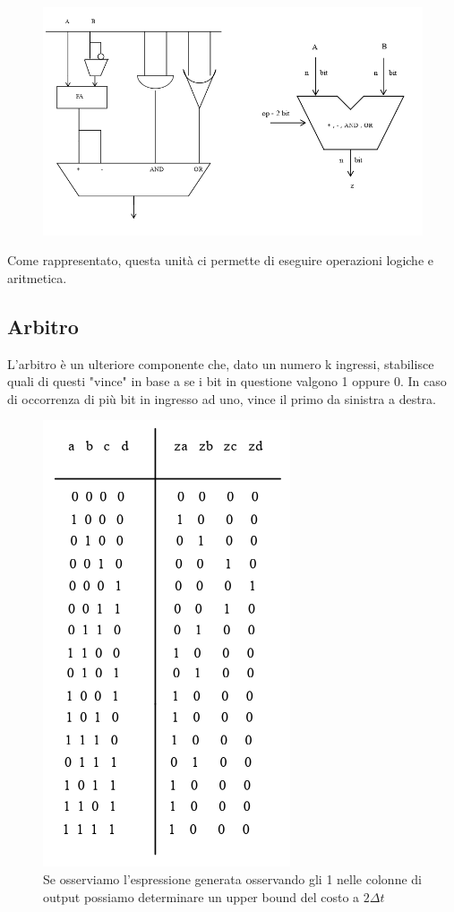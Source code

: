 \documentclass{article}
\begin{document}
\begin{figure}[htbp]
    \center
    \includegraphics[scale=0.45]{img/ALU1.png}
\end{figure}

Come rappresentato, questa unità ci permette di eseguire operazioni logiche e aritmetica.

\subsection{Arbitro}
L'arbitro è un ulteriore componente che, dato un numero k ingressi, stabilisce quali di questi "vince" in base a se i bit in questione 
    valgono 1 oppure 0. In caso di occorrenza di più bit in ingresso ad uno, vince il primo da sinistra a destra.
\begin{figure}[htbp]
    \includegraphics[scale=0.45]{img/tabella_arbitro.png}
    \centering
    \caption{Se osserviamo l'espressione generata osservando gli 1 nelle colonne di output possiamo determinare un upper bound del costo a $2\Delta t$}
\end{figure}
\end{document}
